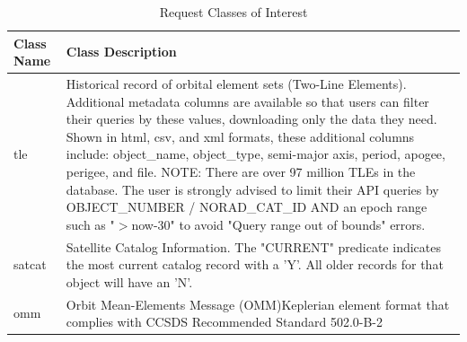 \documentclass[12pt]{article}
\begin{document}
\singlespacing
\begin{table}[H]
	\caption{Request Classes of Interest\cite{SpaceTrackAPI}}
	\label{tab:reqClass}
	\begin{tabular}{|l|p{13.5cm}|}
		\hline
		Class Name     & Class Description                                                                                                                                                                                                                                                                                                                                                                                                                                                                                                                                                                                                                                \\ \hline
		tle            & Historical record of orbital element sets (Two-Line Elements). Additional metadata columns are available so that users can filter their queries by these values, downloading only the data they need. Shown in html, csv, and xml formats, these additional columns include: object\_name, object\_type, semi-major axis, period, apogee, perigee, and file. NOTE: There are over 97 million TLEs in the database. The user is strongly advised to limit their API queries by OBJECT\_NUMBER / NORAD\_CAT\_ID AND an epoch range such as "$>$now-30" to avoid "Query range out of bounds" errors.\\ \hline

		satcat         & Satellite Catalog Information. The "CURRENT" predicate indicates the most current catalog record with a 'Y'. All older records for that object will have an 'N'.\\ \hline      
		
		omm            & Orbit Mean-Elements Message (OMM)Keplerian element format that complies with CCSDS Recommended Standard 502.0-B-2 \\ \hline                                                                                                                                                                                                                                                                                                                                                                                                                                                                           
	\end{tabular}
\end{table}\doublespacing
\end{document}
